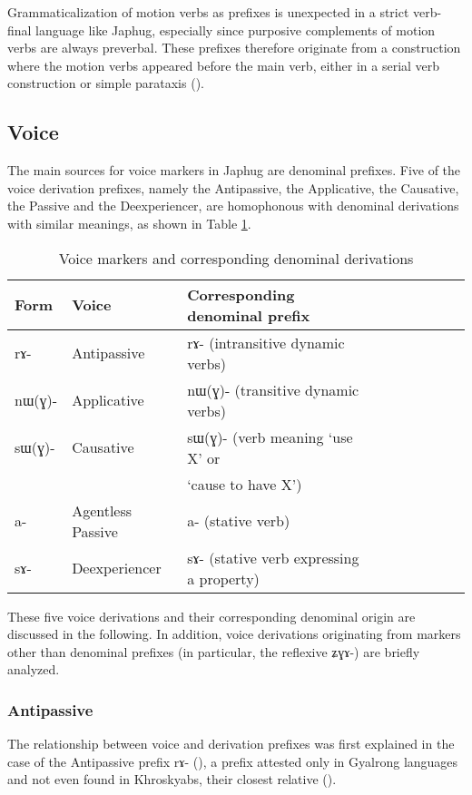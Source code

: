 \documentclass[oldfontcommands,oneside,a4paper,11pt]{article}
\newcommand{\ipa}[1]{\mbox{\phon #1}} %
\begin{document}
Grammaticalization of motion verbs as prefixes is unexpected in a strict verb-final language like Japhug, especially since purposive complements of motion verbs are always preverbal. These prefixes therefore originate from a construction where the motion verbs appeared before the main verb, either in a serial verb construction or simple parataxis (\citealt{jacques13harmonization}).

\subsection{Voice}
The main sources for voice markers in Japhug are denominal prefixes. Five of the voice derivation prefixes, namely the Antipassive, the Applicative, the Causative, the Passive and the Deexperiencer, are homophonous with denominal derivations with similar meanings, as shown in Table \ref{tab:denom}.

\begin{table}[H] \caption{Voice markers and corresponding denominal derivations} \label{tab:denom} \centering
\begin{tabular}{lllllllll} \toprule
Form& Voice & Corresponding denominal prefix \\
\midrule
\ipa{rɤ}- & Antipassive &    \ipa{rɤ}- (intransitive dynamic verbs)\\
\ipa{nɯ(ɣ)}- & Applicative &    \ipa{nɯ(ɣ)}- (transitive dynamic verbs)\\
\ipa{sɯ(ɣ)}- & Causative &    \ipa{sɯ(ɣ)}- (verb meaning `use X' or \\
&& `cause to have X') \\
\ipa{a}- & Agentless Passive &    \ipa{a}- (stative verb)\\
\ipa{sɤ}-  & Deexperiencer &    \ipa{sɤ}- (stative verb expressing a property)\\
    \bottomrule
\end{tabular}
\end{table}

These five voice derivations and their corresponding denominal origin are discussed in the following. In addition, voice derivations originating from markers other than denominal prefixes (in particular, the reflexive \ipa{ʑɣɤ-}) are briefly analyzed.

\subsubsection{Antipassive} \label{sec:apass}
The relationship between voice and derivation prefixes was first explained in the case of the Antipassive prefix \ipa{rɤ-} (\citealt{jacques14antipassive}), a prefix attested only in Gyalrong languages and not even found in Khroskyabs, their closest relative (\citealt{lai13affixale}).
\end{document}
